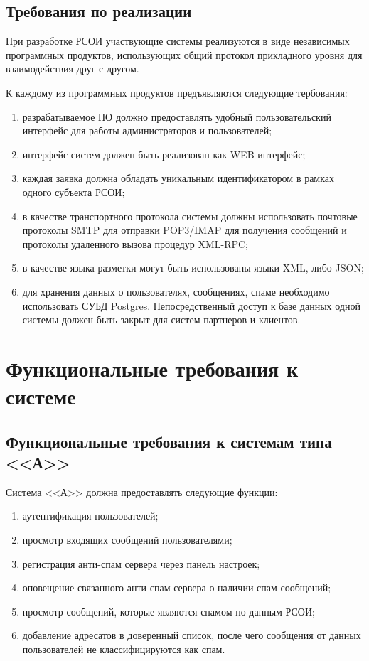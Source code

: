  \subsection{Требования по реализации}
 При разработке РСОИ участвующие системы реализуются в виде независимых программных продуктов, использующих общий протокол прикладного уровня для взаимодействия друг с другом. 

 К каждому из программных продуктов предъявляются следующие тербования:
 \begin{enumerate}
 	\item разрабатываемое ПО должно предоставлять удобный пользовательский интерфейс для работы администраторов и пользователей;
 	\item интерфейс систем должен быть реализован как WEB-интерфейс;
 	\item каждая заявка должна обладать уникальным идентификатором в рамках одного субъекта РСОИ;
 	\item в качестве транспортного протокола системы должны использовать почтовые протоколы SMTP для отправки POP3/IMAP для получения сообщений и протоколы удаленного вызова процедур XML-RPC;
 	\item в качестве языка разметки могут быть использованы языки XML, либо JSON;
 	\item для хранения данных о пользователях, сообщениях, спаме необходимо использовать СУБД Postgres. Непосредственный доступ к базе данных одной системы должен быть закрыт для систем партнеров и клиентов.
 \end{enumerate}


\section{Функциональные требования к системе}
\subsection{Функциональные требования к системам типа <<А>>}
Система <<А>> должна предоставлять следующие функции:
\begin{enumerate}
	\item аутентификация пользователей;
	\item просмотр входящих сообщений пользователями;
	\item регистрация анти-спам сервера через панель настроек;
	\item оповещение связанного анти-спам сервера о наличии спам сообщений;
	\item просмотр сообщений, которые являются спамом по данным РСОИ;
	\item добавление адресатов в доверенный список, после чего сообщения от данных пользователей не классифицируются как спам.
\end{enumerate}




